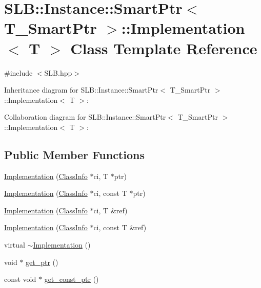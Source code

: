 \hypertarget{classSLB_1_1Instance_1_1SmartPtr_1_1Implementation}{}\section{S\+LB\+:\+:Instance\+:\+:Smart\+Ptr$<$ T\+\_\+\+Smart\+Ptr $>$\+:\+:Implementation$<$ T $>$ Class Template Reference}
\label{classSLB_1_1Instance_1_1SmartPtr_1_1Implementation}


{\ttfamily \#include $<$S\+L\+B.\+hpp$>$}



Inheritance diagram for S\+LB\+:\+:Instance\+:\+:Smart\+Ptr$<$ T\+\_\+\+Smart\+Ptr $>$\+:\+:Implementation$<$ T $>$\+:


Collaboration diagram for S\+LB\+:\+:Instance\+:\+:Smart\+Ptr$<$ T\+\_\+\+Smart\+Ptr $>$\+:\+:Implementation$<$ T $>$\+:
\subsection*{Public Member Functions}
\begin{DoxyCompactItemize}
\item 
\hyperlink{classSLB_1_1Instance_1_1SmartPtr_1_1Implementation_aceb3ed22536e92ec05876160ba2b61e4}{Implementation} (\hyperlink{classSLB_1_1ClassInfo}{Class\+Info} $\ast$ci, T $\ast$ptr)
\item 
\hyperlink{classSLB_1_1Instance_1_1SmartPtr_1_1Implementation_a2b74b9e07d9200462b7ecc4518834832}{Implementation} (\hyperlink{classSLB_1_1ClassInfo}{Class\+Info} $\ast$ci, const T $\ast$ptr)
\item 
\hyperlink{classSLB_1_1Instance_1_1SmartPtr_1_1Implementation_af41effb20da1ae40df07fbf765a278b5}{Implementation} (\hyperlink{classSLB_1_1ClassInfo}{Class\+Info} $\ast$ci, T \&ref)
\item 
\hyperlink{classSLB_1_1Instance_1_1SmartPtr_1_1Implementation_ac4fca3eff39c219c8ca43163fbe9a4d6}{Implementation} (\hyperlink{classSLB_1_1ClassInfo}{Class\+Info} $\ast$ci, const T \&ref)
\item 
virtual \hyperlink{classSLB_1_1Instance_1_1SmartPtr_1_1Implementation_a1f49454f8d863a6a6c0ce7cf75f1c8cd}{$\sim$\+Implementation} ()
\item 
void $\ast$ \hyperlink{classSLB_1_1Instance_1_1SmartPtr_1_1Implementation_a0c3bbfcc496a499c970176a754ab24ef}{get\+\_\+ptr} ()
\item 
const void $\ast$ \hyperlink{classSLB_1_1Instance_1_1SmartPtr_1_1Implementation_a2eff1fcc2b6ea5e62d44f5307542aaca}{get\+\_\+const\+\_\+ptr} ()
\end{DoxyCompactItemize}
